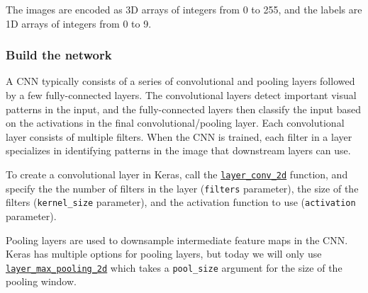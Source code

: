 \documentclass[
  a4paper,
]{article}
\newenvironment{Shaded}{\begin{snugshade}}{\end{snugshade}}
\newcommand{\CommentTok}[1]{\textcolor[rgb]{0.56,0.35,0.01}{\textit{#1}}}
\newcommand{\FunctionTok}[1]{\textcolor[rgb]{0.00,0.00,0.00}{#1}}
\newcommand{\NormalTok}[1]{#1}
\newcommand{\OtherTok}[1]{\textcolor[rgb]{0.56,0.35,0.01}{#1}}
\newcommand{\SpecialCharTok}[1]{\textcolor[rgb]{0.00,0.00,0.00}{#1}}
\begin{document}
\begin{Shaded}
\end{Shaded}

The images are encoded as 3D arrays of integers from 0 to 255, and the
labels are 1D arrays of integers from 0 to 9.

\hypertarget{build-the-network}{%
\subsubsection{Build the network}\label{build-the-network}}

A CNN typically consists of a series of convolutional and pooling layers
followed by a few fully-connected layers. The convolutional layers
detect important visual patterns in the input, and the fully-connected
layers then classify the input based on the activations in the final
convolutional/pooling layer. Each convolutional layer consists of
multiple filters. When the CNN is trained, each filter in a layer
specializes in identifying patterns in the image that downstream layers
can use.

To create a convolutional layer in Keras, call the
\href{https://keras.rstudio.com/reference/layer_conv_2d.html}{\texttt{layer\_conv\_2d}}
function, and specify the the number of filters in the layer
(\texttt{filters} parameter), the size of the filters
(\texttt{kernel\_size} parameter), and the activation function to use
(\texttt{activation} parameter).

Pooling layers are used to downsample intermediate feature maps in the
CNN. Keras has multiple options for pooling layers, but today we will
only use
\href{https://keras.rstudio.com/reference/layer_max_pooling_2d.html}{\texttt{layer\_max\_pooling\_2d}}
which takes a \texttt{pool\_size} argument for the size of the pooling
window.
\end{document}
